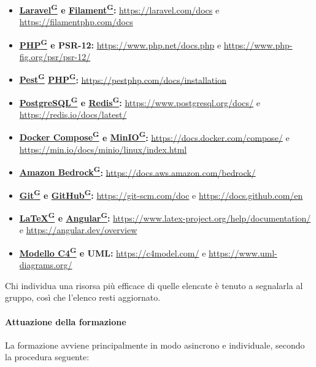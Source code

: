 \documentclass[a4paper,12pt]{article}
\providecommand{\glslink}[2]{\href{https://alittlebyte-19.github.io/Documentazione/glossario.html\#gls-#1}{\underline{#2}\textsuperscript{\scriptsize G}}}
\begin{document}
\begin{itemize}
    \item \textbf{\glslink{laravel}{Laravel} e \glslink{filament}{Filament}:} \url{https://laravel.com/docs} e \url{https://filamentphp.com/docs}
    \item \textbf{\glslink{php}{PHP} e PSR-12:} \url{https://www.php.net/docs.php} e \url{https://www.php-fig.org/psr/psr-12/}
    \item \textbf{\glslink{pest}{Pest} \glslink{php}{PHP}:} \url{https://pestphp.com/docs/installation}
    \item \textbf{\glslink{postgresql}{PostgreSQL} e \glslink{redis}{Redis}:} \url{https://www.postgresql.org/docs/} e \url{https://redis.io/docs/latest/}
    \item \textbf{\glslink{docker-compose}{Docker Compose} e \glslink{minio}{MinIO}:} \url{https://docs.docker.com/compose/} e \url{https://min.io/docs/minio/linux/index.html}
    \item \textbf{\glslink{amazon-bedrock}{Amazon Bedrock}:} \url{https://docs.aws.amazon.com/bedrock/}
    \item \textbf{\glslink{git}{Git} e \glslink{github}{GitHub}:} \url{https://git-scm.com/doc} e \url{https://docs.github.com/en}
    \item \textbf{\glslink{latex}{LaTeX} e \glslink{angular}{Angular}:} \url{https://www.latex-project.org/help/documentation/} e \url{https://angular.dev/overview}
    \item \textbf{\glslink{modello-c4}{Modello C4} e UML:} \url{https://c4model.com/} e \url{https://www.uml-diagrams.org/}
\end{itemize}

Chi individua una risorsa più efficace di quelle elencate è tenuto a segnalarla al gruppo, così che l'elenco resti aggiornato.

\paragraph{Attuazione della formazione}
La formazione avviene principalmente in modo asincrono e individuale, secondo la procedura seguente:
\end{document}
